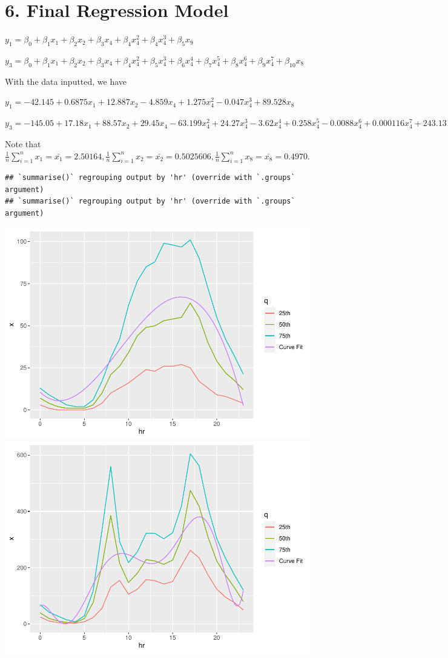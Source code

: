 \documentclass[
]{article}
\begin{document}
\hypertarget{final-regression-model}{%
\section{6. Final Regression Model}\label{final-regression-model}}

\(y_{1} = \beta_{0} + \beta_{1}x_{1} + \beta_{2}x_{2} + \beta_{3}x_{4} + \beta_{4}x_{4}^{2} + \beta_{4}x_{4}^{3} + \beta_{5}x_{9}\)

\(y_{3} = \beta_{0} + \beta_{1}x_{1} + \beta_{2}x_{2} + \beta_{3}x_{4} + \beta_{4}x_{4}^{2} + \beta_{5}x_{4}^{3} + \beta_{6}x_{4}^{4} + \beta_{7}x_{4}^{5} + \beta_{8}x_{4}^{6} + \beta_{9}x_{4}^{7} + \beta_{10}x_{8}\)

With the data inputted, we have

\(y_{1} = -42.145 + 0.6875x_{1} + 12.887x_{2} - 4.859x_{4} + 1.275x_{4}^{2} - 0.047x_{4}^{3} + 89.528x_{8}\)

\(y_{3} = -145.05 + 17.18x_{1} + 88.57x_{2} + 29.45x_{4} - 63.199x_{4}^{2} + 24.27x_{4}^{3} - 3.62x_{4}^{4} + 0.258x_{4}^{5} - 0.0088x_{4}^{6} + 0.000116x_{4}^{7} + 243.131x_{8}\)

Note that
\(\frac{1}{n}\sum_{i=1}^{n} x_{1} = \bar{x_{1}} = 2.50164, \frac{1}{n}\sum_{i=1}^{n} x_{2} = \bar{x_{2}} = 0.5025606, \frac{1}{n}\sum_{i=1}^{n} x_{8} = \bar{x_{8}} = 0.4970\).

\begin{verbatim}
## `summarise()` regrouping output by 'hr' (override with `.groups` argument)
## `summarise()` regrouping output by 'hr' (override with `.groups` argument)
\end{verbatim}

\includegraphics{LeastSquares_files/figure-latex/unnamed-chunk-14-1.pdf}
\includegraphics{LeastSquares_files/figure-latex/unnamed-chunk-14-2.pdf}
\end{document}
